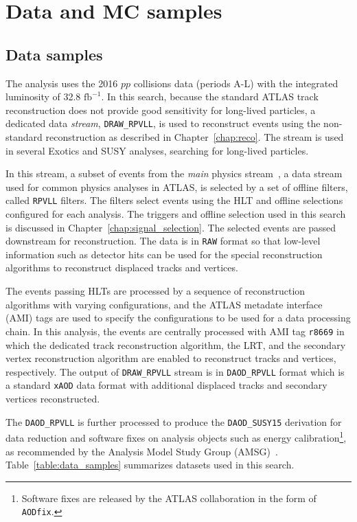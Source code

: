 \chapter{Data and MC samples}
\label{chap:data_mc}

\section{Data samples}
\label{sec:data_mc:data}

The analysis uses the 2016 $pp$ collisions data (periods A-L) with the integrated luminosity of 32.8 $\mathrm{fb^{-1}}$. In this search, because the standard ATLAS track reconstruction does not provide good sensitivity for long-lived particles, a dedicated data \textit{stream}, \texttt{DRAW\_RPVLL}, is used to reconstruct events using the non-standard reconstruction as described in Chapter~\ref{chap:reco}. The stream is used in several Exotics and SUSY analyses, searching for long-lived particles. %

In this stream, a subset of events from the \textit{main} physics stream~\cite{Aaboud:2016leb}, a data stream used for common physics analyses in ATLAS, is selected by a set of offline filters, called \texttt{RPVLL} filters. The filters select events using the HLT and offline selections configured for each analysis. The triggers and offline selection used in this search is discussed in Chapter~\ref{chap:signal_selection}. The selected events are passed downstream for reconstruction. The data is in \texttt{RAW} format so that low-level information such as detector hits can be used for the special reconstruction algorithms to reconstruct displaced tracks and vertices.

The events passing HLTs are processed by a sequence of reconstruction algorithms with varying configurations, and the ATLAS metadate interface (AMI) tags are used to specify the configurations to be used for a data processing chain. In this analysis, the events are centrally processed with AMI tag \texttt{r8669} in which the dedicated track reconstruction algorithm, the LRT, and the secondary vertex reconstruction algorithm are enabled to reconstruct tracks and vertices, respectively. The output of \texttt{DRAW\_RPVLL} stream is in \texttt{DAOD\_RPVLL} format which is a standard \texttt{xAOD} data format with additional displaced tracks and secondary vertices reconstructed. 

The \texttt{DAOD\_RPVLL} is further processed to produce the \texttt{DAOD\_SUSY15} derivation for data reduction and software fixes on analysis objects such as energy calibration\footnote{Software fixes are released by the ATLAS collaboration in the form of \texttt{AODfix}.}, as recommended by the Analysis Model Study Group (AMSG)~\cite{Catmore:1543445}. Table~\ref{table:data_samples} summarizes datasets used in this search.

